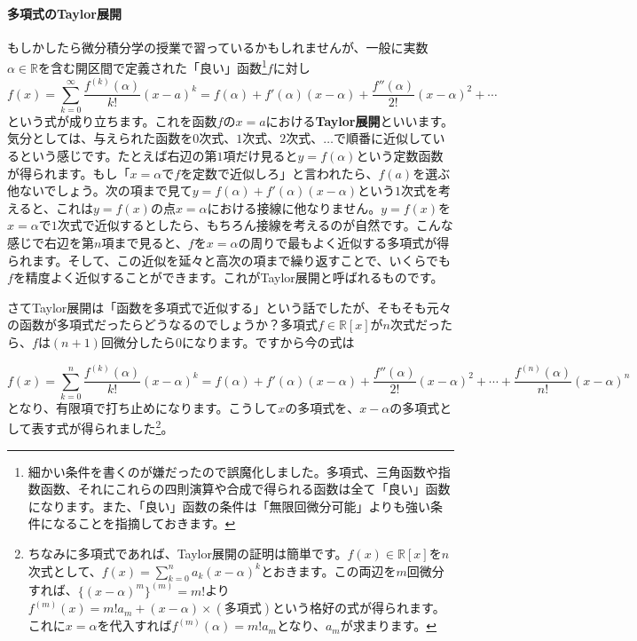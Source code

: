 \paragraph{多項式のTaylor展開}

もしかしたら微分積分学の授業で習っているかもしれませんが、一般に実数$\alpha\in\mathbb{R}$を含む開区間で定義された「良い」函数\footnote{細かい条件を書くのが嫌だったので誤魔化しました。多項式、三角函数や指数函数、それにこれらの四則演算や合成で得られる函数は全て「良い」函数になります。また、「良い」函数の条件は「無限回微分可能」よりも強い条件になることを指摘しておきます。}$f$に対し
\[
f(x) = \sum_{k = 0}^{\infty} \frac{f^{(k)}(\alpha)}{k!} (x - a)^k = f(\alpha) + f'(\alpha)(x - \alpha) + \frac{f''(\alpha)}{2!}(x - \alpha)^2 + \cdots
\]
という式が成り立ちます。これを函数$f$の$x = a$における\textbf{Taylor展開}といいます。気分としては、与えられた函数を$0$次式、$1$次式、$2$次式、$\ldots$で順番に近似しているという感じです。たとえば右辺の第$1$項だけ見ると$y = f(\alpha)$という定数函数が得られます。もし「$x = \alpha$で$f$を定数で近似しろ」と言われたら、$f(a)$を選ぶ他ないでしょう。次の項まで見て$y = f(\alpha) + f'(\alpha)(x - \alpha)$という$1$次式を考えると、これは$y = f(x)$の点$x = \alpha$における接線に他なりません。$y = f(x)$を$x = \alpha$で$1$次式で近似するとしたら、もちろん接線を考えるのが自然です。こんな感じで右辺を第$n$項まで見ると、$f$を$x = \alpha$の周りで最もよく近似する多項式が得られます。そして、この近似を延々と高次の項まで繰り返すことで、いくらでも$f$を精度よく近似することができます。これがTaylor展開と呼ばれるものです。

さてTaylor展開は「函数を多項式で近似する」という話でしたが、そもそも元々の函数が多項式だったらどうなるのでしょうか？多項式$f\in\mathbb{R}[x]$が$n$次式だったら、$f$は$(n+1)$回微分したら$0$になります。ですから今の式は

\[
f(x) = \sum_{k = 0}^{n} \frac{f^{(k)}(\alpha)}{k!} (x - \alpha)^k = f(\alpha) + f'(\alpha)(x - \alpha) + \frac{f''(\alpha)}{2!}(x - \alpha)^2 + \cdots + \frac{f^{(n)}(\alpha)}{n!}(x - \alpha)^n
\]
となり、有限項で打ち止めになります。こうして$x$の多項式を、$x - \alpha$の多項式として表す式が得られました\footnote{ちなみに多項式であれば、Taylor展開の証明は簡単です。$f(x)\in\mathbb{R}[x]$を$n$次式として、$f(x) = \sum_{k = 0}^n a_k (x - \alpha)^k$とおきます。この両辺を$m$回微分すれば、$\bigl\{(x - \alpha)^m\bigr\}^{(m)} = m!$より$f^{(m)}(x) = m!a_m + (x - \alpha)\times(\text{多項式})$という格好の式が得られます。これに$x = \alpha$を代入すれば$f^{(m)}(\alpha) = m! a_m$となり、$a_m$が求まります。}。

